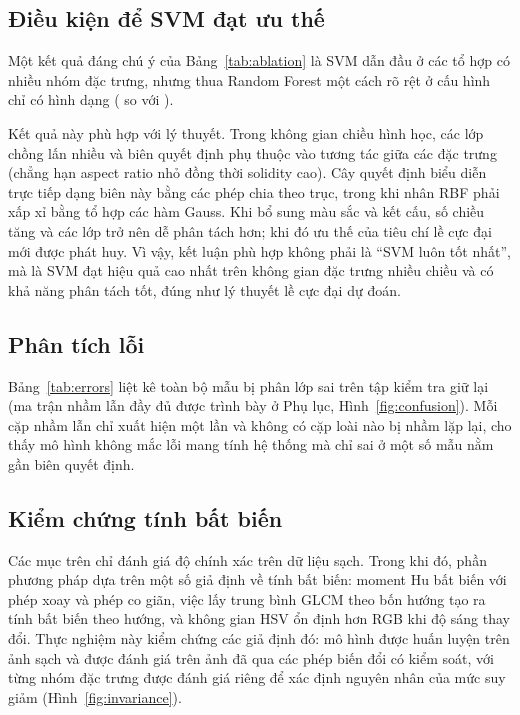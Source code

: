 \documentclass[11pt,a4paper]{article}
\newif\ifshowtodo\showtodofalse
\newcommand{\todo}[1]{\ifshowtodo{\color{red}\small[TODO: #1]}\fi}
\begin{document}
\subsection{Điều kiện để SVM đạt ưu thế}

Một kết quả đáng chú ý của Bảng~\ref{tab:ablation} là SVM dẫn đầu ở các tổ hợp có nhiều nhóm đặc
trưng, nhưng thua Random Forest một cách rõ rệt ở cấu hình chỉ có hình dạng (\shapeonlyacc{} so với
\shapeonlyrf{}).

Kết quả này phù hợp với lý thuyết. Trong không gian \shapedims{} chiều hình học, các lớp chồng lấn
nhiều và biên quyết định phụ thuộc vào tương tác giữa các đặc trưng (chẳng hạn aspect ratio nhỏ đồng
thời solidity cao). Cây quyết định biểu diễn trực tiếp dạng biên này bằng các phép chia theo trục,
trong khi nhân RBF phải xấp xỉ bằng tổ hợp các hàm Gauss. Khi bổ sung màu sắc và kết cấu, số chiều
tăng và các lớp trở nên dễ phân tách hơn; khi đó ưu thế của tiêu chí lề cực đại mới được phát huy.
Vì vậy, kết luận phù hợp không phải là ``SVM luôn tốt nhất'', mà là SVM đạt hiệu quả cao nhất trên
không gian đặc trưng nhiều chiều và có khả năng phân tách tốt, đúng như lý thuyết lề cực đại dự đoán.

\subsection{Phân tích lỗi}

Bảng~\ref{tab:errors} liệt kê toàn bộ \holdouterrors{} mẫu bị phân lớp sai trên tập kiểm tra giữ lại
(ma trận nhầm lẫn đầy đủ được trình bày ở Phụ lục, Hình~\ref{fig:confusion}). Mỗi cặp nhầm lẫn chỉ
xuất hiện một lần và không có cặp loài nào bị nhầm lặp lại, cho thấy mô hình không mắc lỗi mang tính
hệ thống mà chỉ sai ở một số mẫu nằm gần biên quyết định.

\todo{mở ảnh của vài mẫu sai trong Bảng~\ref{tab:errors} và nhận xét bằng quan sát trực quan:
các cặp này có giống nhau về hình dạng/màu không?}

\subsection{Kiểm chứng tính bất biến}
\label{sec:invariance}

Các mục trên chỉ đánh giá độ chính xác trên dữ liệu sạch. Trong khi đó, phần phương pháp dựa trên một
số giả định về tính bất biến: moment Hu bất biến với phép xoay và phép co giãn, việc lấy trung bình
GLCM theo bốn hướng tạo ra tính bất biến theo hướng, và không gian HSV ổn định hơn RGB khi độ sáng thay
đổi. Thực nghiệm này kiểm chứng các giả định đó: mô hình được huấn luyện trên ảnh sạch và được đánh giá
trên ảnh đã qua các phép biến đổi có kiểm soát, với từng nhóm đặc trưng được đánh giá riêng để xác
định nguyên nhân của mức suy giảm (Hình~\ref{fig:invariance}).
\end{document}
